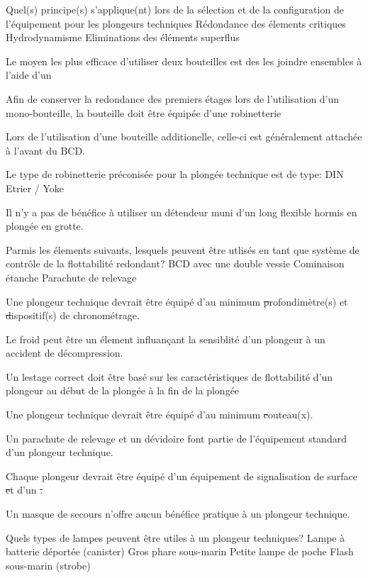 \documentclass[english,10pt,a4paper]{article}
\begin{document}
	\begin{outline}
		\1 Quel(s) principe(s) s'applique(nt) lors de la sélection et de la configuration de l'équipement pour les plongeurs techniques
			\2 Rédondance des élements critiques
			\2 Hydrodynamisme
			\2 Eliminations des éléments superflus
	
		\1 Le moyen les plus efficace d'utiliser deux bouteilles est des les joindre ensembles à l'aide d'un \st
		\vspace{1cm}

		\1 Afin de conserver la redondance des premiers étages lors de l'utilisation d'un mono-bouteille, la bouteille doit être équipée d'une robinetterie \st
		\vspace{1cm}

		\1 Lors de l'utilisation d'une bouteille additionelle, celle-ci est généralement attachée à l'avant du BCD. \vf

		\1 Le type de robinetterie préconisée pour la plongée technique est de type:
			\2 DIN
			\2 Etrier / Yoke

		\1 Il n'y a pas de bénéfice à utiliser un détendeur muni d'un long flexible hormis en plongée en grotte. \vf

		\1 Parmis les élements suivants, lesquels peuvent être utlisés en tant que système de contrôle de la flottabilité redondant?
			\2 BCD avec une double vessie
			\2 Cominaison étanche
			\2 Parachute de relevage

		\1 Une plongeur technique devrait être équipé d'au minimum \st profondimètre(s) et \st dispositif(s) de chronométrage.
		\vspace{1cm}

		\1 Le froid peut être un élement influançant la sensiblité d'un plongeur à un accident de décompression. \vf

		\1 Un lestage correct doit être basé sur les caractéristiques de flottabilité d'un plongeur \st
			\2 au début de la plongée
			\2 à la fin de la plongée

		\1 Une plongeur technique devrait être équipé d'au minimum \st couteau(x).
		\vspace{1cm}

		\1 Un parachute de relevage et un dévidoire font partie de l'équipement standard d'un plongeur technique. \vf

		\1 Chaque plongeur devrait être équipé d'un équipement de signalisation de surface \st et d'un \st. %
		\vspace{1cm}

		\1 Un masque de secours n'offre aucun bénéfice pratique à un plongeur technique. \vf

		\1 Quels types de lampes peuvent être utiles à un plongeur techniques?
			\2 Lampe à batterie déportée (canister)
			\2 Gros phare sous-marin
			\2 Petite lampe de poche
			\2 Flash sous-marin (strobe)
	\end{outline}
	\pagebreak
\end{document}
